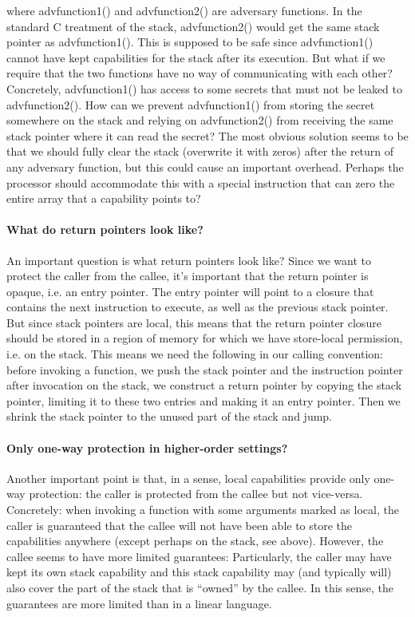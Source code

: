 \documentclass[a4paper]{article}
\begin{document}
where advfunction1() and advfunction2() are adversary functions. In the standard
C treatment of the stack, advfunction2() would get the same stack pointer as
advfunction1(). This is supposed to be safe since advfunction1() cannot have
kept capabilities for the stack after its execution. But what if we require that
the two functions have no way of communicating with each other? Concretely,
advfunction1() has access to some secrets that must not be leaked to
advfunction2(). How can we prevent advfunction1() from storing the secret
somewhere on the stack and relying on advfunction2() from receiving the same
stack pointer where it can read the secret? The most obvious solution seems to
be that we should fully clear the stack (overwrite it with zeros) after the
return of any adversary function, but this could cause an important overhead.
Perhaps the processor should accommodate this with a special instruction that can
zero the entire array that a capability points to?

\paragraph{What do return pointers look like?}
An important question is what return pointers look like? Since we want to
protect the caller from the callee, it's important that the return pointer is
opaque, i.e. an entry pointer. The entry pointer will point to a closure that
contains the next instruction to execute, as well as the previous stack pointer.
But since stack pointers are local, this means that the return pointer closure
should be stored in a region of memory for which we have store-local permission,
i.e. on the stack. This means we need the following in our calling convention:
before invoking a function, we push the stack pointer and the instruction
pointer after invocation on the stack, we construct a return pointer by
copying the stack pointer, limiting it to these two entries and making it an
entry pointer.  Then we shrink the stack pointer to the unused part of the stack
and jump. 

\paragraph{Only one-way protection in higher-order settings?}
Another important point is that, in a sense, local capabilities provide only
one-way protection: the caller is protected from the callee but not vice-versa.
Concretely: when invoking a function with some arguments marked as local, the
caller is guaranteed that the callee will not have been able to store the
capabilities anywhere (except perhaps on the stack, see above). However, the
callee seems to have more limited guarantees: Particularly, the caller may have
kept its own stack capability and this stack capability may (and typically will)
also cover the part of the stack that is ``owned'' by the callee.  In this
sense, the guarantees are more limited than in a linear language.
\end{document}
